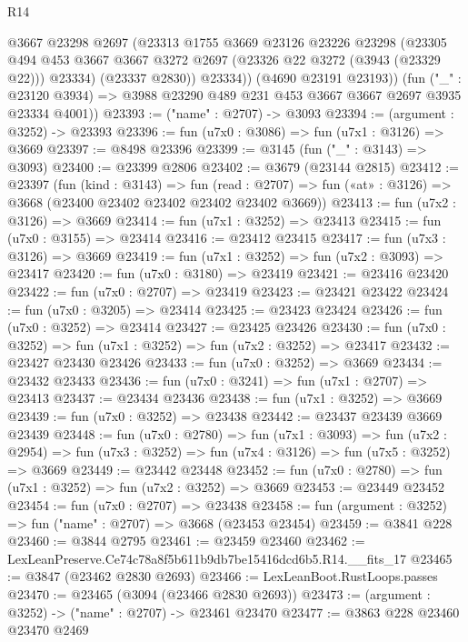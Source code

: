 \begin{lexlean}{R14}
\begin{coremodule}
            @3667
            @23298
            @2697
            (@23313
              @1755
              @3669
              @23126
              @23226
              @23298
              (@23305
                @494
                @453
                @3667
                @3667
                @3272
                @2697
                (@23326 @22 @3272 (@3943 (@23329 @22)))
                @23334)
              (@23337 @2830))
            @23334))
        (@4690 @23191 @23193))
      (fun ("_" : @23120 @3934) =>
      @3988 @23290 @489 @231 @453 @3667 @3667 @2697 @3935 @23334 @4001))
@23393 := ("name" : @2707) -> @3093
@23394 := (argument : @3252) -> @23393
@23396 := fun (u7x0 : @3086) => fun (u7x1 : @3126) => @3669
@23397 := @8498 @23396
@23399 := @3145 (fun ("_" : @3143) => @3093)
@23400 := @23399 @2806
@23402 := @3679 (@23144 @2815)
@23412 := @23397
    (fun (kind : @3143) =>
    fun (read : @2707) => fun («at» : @3126) => @3668 (@23400 @23402 @23402 @23402 @23402 @3669))
@23413 := fun (u7x2 : @3126) => @3669
@23414 := fun (u7x1 : @3252) => @23413
@23415 := fun (u7x0 : @3155) => @23414
@23416 := @23412 @23415
@23417 := fun (u7x3 : @3126) => @3669
@23419 := fun (u7x1 : @3252) => fun (u7x2 : @3093) => @23417
@23420 := fun (u7x0 : @3180) => @23419
@23421 := @23416 @23420
@23422 := fun (u7x0 : @2707) => @23419
@23423 := @23421 @23422
@23424 := fun (u7x0 : @3205) => @23414
@23425 := @23423 @23424
@23426 := fun (u7x0 : @3252) => @23414
@23427 := @23425 @23426
@23430 := fun (u7x0 : @3252) => fun (u7x1 : @3252) => fun (u7x2 : @3252) => @23417
@23432 := @23427 @23430 @23426
@23433 := fun (u7x0 : @3252) => @3669
@23434 := @23432 @23433
@23436 := fun (u7x0 : @3241) => fun (u7x1 : @2707) => @23413
@23437 := @23434 @23436
@23438 := fun (u7x1 : @3252) => @3669
@23439 := fun (u7x0 : @3252) => @23438
@23442 := @23437 @23439 @3669 @23439
@23448 := fun (u7x0 : @2780) =>
  fun (u7x1 : @3093) =>
  fun (u7x2 : @2954) => fun (u7x3 : @3252) => fun (u7x4 : @3126) => fun (u7x5 : @3252) => @3669
@23449 := @23442 @23448
@23452 := fun (u7x0 : @2780) => fun (u7x1 : @3252) => fun (u7x2 : @3252) => @3669
@23453 := @23449 @23452
@23454 := fun (u7x0 : @2707) => @23438
@23458 := fun (argument : @3252) => fun ("name" : @2707) => @3668 (@23453 @23454)
@23459 := @3841 @228
@23460 := @3844 @2795
@23461 := @23459 @23460
@23462 := LexLeanPreserve.Ce74c78a8f5b611b9db7be15416dcd6b5.R14.__fits_17
@23465 := @3847 (@23462 @2830 @2693)
@23466 := LexLeanBoot.RustLoops.passes
@23470 := @23465 (@3094 (@23466 @2830 @2693))
@23473 := (argument : @3252) -> ("name" : @2707) -> @23461 @23470
@23477 := @3863 @228 @23460 @23470 @2469

\end{coremodule}
\end{lexlean}
